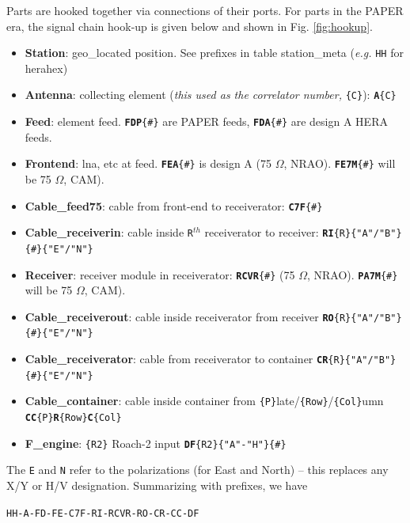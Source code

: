 \documentclass{article}
\begin{document}
Parts are hooked together via connections of their ports.   For parts in the PAPER era, the signal chain hook-up is given below and shown in Fig. \ref{fig:hookup}.
\begin{itemize}\setlength\itemsep{-.3em}
	\item {\bf Station}: geo\_located position.  See prefixes in table station\_meta ({\em e.g.} {\tt HH} for herahex)
	\item {\bf Antenna}:  collecting element ({\em this used as the correlator number,} {\tt \{C\}}):  {\tt{\bf A}\{C\}}
	\item {\bf Feed}:  element feed.  {\tt {\bf FDP}\{\#\}} are PAPER feeds, {\tt {\bf FDA}\{\#\}} are design A HERA feeds.
	\item {\bf Frontend}:  lna, etc at feed.  {\tt {\bf FEA}\{\#\}} is design A (75 $\Omega$, NRAO).  {\tt {\bf FE7M}\{\#\}} will be 75 $\Omega$, CAM).
	\item {\bf Cable\_feed75}:  cable from front-end to receiverator: {\tt {\bf C7F}\{\#\}}
	\item {\bf Cable\_receiverin}:  cable inside {\tt R}$^{th}$ receiverator to receiver: {\tt {\bf RI}\{R\}\{"A"/"B"\}\{\#\}\{"E"/"N"\}}
	\item {\bf Receiver}:  receiver module in receiverator: {\tt {\bf RCVR}\{\#\}} (75 $\Omega$, NRAO).  {\tt {\bf PA7M}\{\#\}} will be 75 $\Omega$, CAM).
	\item {\bf Cable\_receiverout}:  cable inside receiverator from receiver {\tt {\bf RO}\{R\}\{"A"/"B"\}\{\#\}\{"E"/"N"\}}
	\item {\bf Cable\_receiverator}:  cable from receiverator to container {\tt {\bf CR}\{R\}\{"A"/"B"\}\{\#\}\{"E"/"N"\}}
	\item {\bf Cable\_container}:  cable inside container from {\tt\{P\}}late/{\tt\{Row\}}/{\tt\{Col\}}umn {\tt {\bf CC}\{P\}{\bf R}\{Row\}{\bf C}\{Col\}}
	\item {\bf F\_engine}:  {\tt\{R2\}} Roach-2 input {\tt {\bf DF}\{R2\}\{"A"-"H"\}\{\#\}}
\end{itemize}
The {\tt E} and {\tt N} refer to the polarizations (for East and North) -- this replaces any X/Y or H/V designation.
Summarizing with prefixes, we have 

\vspace{.15in}
\begin{center}
{\tt HH-A-FD-FE-C7F-RI-RCVR-RO-CR-CC-DF}
\end{center}
\vspace{.15in}
\end{document}
